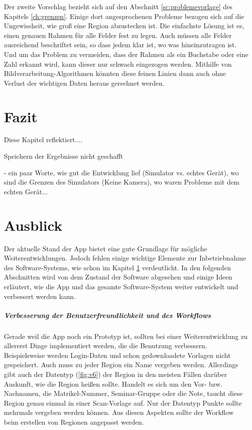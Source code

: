 \documentclass[nomenclature, oneside, 150]{HSMW-Thesis}
\begin{document}
	Der zweite Vorschlag bezieht sich auf den Abschnitt \ref{sc:problemevorlage} des Kapitels \ref{ch:grenzen}. Einige dort angesprochenen Probleme bezogen sich auf die Ungewissheit, wie groß eine Region abzustecken ist. Die einfachste Lösung ist es, einen genauen Rahmen für alle Felder fest zu legen. Auch müssen alle Felder ausreichend beschriftet sein, so dass jedem klar ist, wo was hineinzutragen ist. Und um das Problem zu vermeiden, dass der Rahmen als ein Buchstabe oder eine Zahl erkannt wird, kann dieser nur schwach eingezogen werden. Mithilfe von Bildverarbeitung-Algorithmen könnten diese feinen Linien dann auch ohne Verlust der wichtigen Daten heraus gerechnet werden.     


\chapter{Fazit}\label{ch:fazit}
	Diese Kapitel reflektiert....
	
	Speichern der Ergebnisse nicht geschafft 
	
	- ein paar Worte, wie gut die Entwicklung lief (Simulator vs. echtes Gerät), wo sind die Grenzen des Simulators (Keine Kamera), wo waren Probleme mit dem echten Gerät...


		
\chapter{Ausblick}
	Der aktuelle Stand der App bietet eine gute Grundlage für mögliche Weiterentwicklungen. Jedoch fehlen einige wichtige Elemente zur Inbetriebnahme des Software-Systems, wie schon im Kapitel \ref{ch:fazit} verdeutlicht. In den folgenden Abschnitten wird von dem Zustand der Software abgesehen und einige Ideen erläutert, wie die App und das gesamte Software-System weiter entwickelt und verbessert werden kann.

	\paragraph{Verbesserung der Benutzerfreundlichkeit und des Workflows} Gerade weil die App noch ein Prototyp ist, sollten bei einer Weiterentwicklung zu allererst Dinge implementiert werden, die die Benutzung verbessern. Beispielsweise werden Login-Daten und schon gedownloadete Vorlagen nicht gespeichert. Auch muss zu jeder Region ein Name vergeben werden. Allerdings gibt auch der Datentyp (\ref{fig:v6}) der Region in den meisten Fällen darüber Auskunft, wie die Region heißen sollte. Handelt es sich um den Vor- bzw. Nachnamen, die Matrikel-Nummer, Seminar-Gruppe oder die Note, taucht diese Region genau einmal in einer Scan-Vorlage auf. Nur der Datentyp Punkte sollte mehrmals vergeben werden können. Aus diesen Aspekten sollte der Workflow beim erstellen von Regionen angepasst werden.
	
\end{document}
